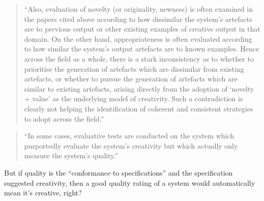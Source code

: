 \begin{quote}
  ``Also, evaluation of novelty (or originality, newness) is often examined in the papers cited above according to how dissimilar the system’s artefacts are to previous output or other existing examples of creative output in that domain. On the other hand, appropriateness is often evaluated according to how similar the system’s output artefacts are to known examples. Hence across the field as a whole, there is a stark inconsistency as to whether to prioritise the generation of artefacts which are dissimilar from existing artefacts, or whether to pursue the generation of artefacts which are similar to existing artefacts, arising directly from the adoption of ‘novelty + value’ as the underlying model of creativity. Such a contradiction is clearly not helping the identification of coherent and consistent strategies to adopt across the field.'' \autocite{Jordanous2012}
\end{quote}

\begin{quote}
  ``In some cases, evaluative tests are conducted on the system which purportedly evaluate the system’s creativity but which actually only measure the system’s quality.'' \autocite{Jordanous2012}
\end{quote}

\begin{draft}
  But if quality is the ``conformance to specifications'' and the specification suggested creativity, then a good quality rating of a system would automatically mean it's creative, right?
\end{draft}



